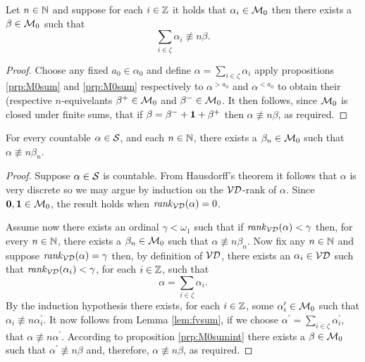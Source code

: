 \begin{prp}\label{prp:M0sumint}
	Let $n\in\mathbb{N}$ and suppose for each $i\in\mathbb{Z}$ it holds that $\alpha_i\in\mathcal{M}_0$ then there exists a $\beta\in\mathcal{M}_0$ such that
	\begin{equation}
		\sum_{i\in\zeta}\alpha_i\nequiv{n}\beta.
	\end{equation}
\end{prp}
\begin{proof}
	Choose any fixed $a_0\in\alpha_0$ and define $\alpha=\sum_{i\in\zeta}\alpha_i$ apply propositions \ref{prp:M0sum} and \ref{prp:M0sum} respectively to $\alpha^{>a_0}$ and $\alpha^{<a_0}$ to obtain their (respective $n$-equivelants $\beta^+\in\mathcal{M}_0$ and $\beta^-\in\mathcal{M}_0$.  It then follows, since $\mathcal{M}_0$ is closed under finite sums, that if $\beta=\beta^-+\mathbf{1}+\beta^+$ then $\alpha\nequiv{n}\beta$, as required.
\end{proof}

\begin{thm}
	For every countable $\alpha\in\mathcal{S}$, and each $n\in\mathbb{N}$, there exists a $\beta_n\in\mathcal{M}_0$ such that $\alpha\nequiv{n}\beta_n$.
\end{thm}
\begin{proof}
	Suppose $\alpha\in\mathcal{S}$ is countable.  From Hausdorff's theorem it follows that $\alpha$ is very discrete so we may argue by induction on the $\mathcal{VD}$-rank of $\alpha$. Since $\mathbf{0},\mathbf{1}\in\mathcal{M}_0$, the result holds when $\mathit{rank}_\mathcal{VD}(\alpha)=0$.

	Assume now there exists an ordinal $\gamma<\omega_1$ such that if $\mathit{rank}_\mathcal{VD}(\alpha)<\gamma$ then, for every $n\in\mathbb{N}$, there exists a $\beta_n\in\mathcal{M}_0$ such that $\alpha\nequiv{n}\beta_n$.  Now fix any $n\in\mathbb{N}$ and  suppose $\mathit{rank}_\mathcal{VD}(\alpha)=\gamma$ then, by definition of $\mathcal{VD}$, there exists an $\alpha_i\in\mathcal{VD}$ such that $\mathit{rank}_\mathcal{VD}(\alpha_i)<\gamma$, for each $i\in\mathbb{Z}$, such that
	\begin{equation}
		\alpha=\sum_{i\in\zeta}\alpha_i.
	\end{equation}
	By the induction hypothesis there exists, for each $i\in\mathbb{Z}$, some $\alpha^\prime_i\in\mathcal{M}_0$ such that $\alpha_i\nequiv{n}\alpha_i^\prime$.  It now follows from Lemma \ref{lem:fvsum}, if we choose $\alpha^\prime=\sum_{i\in\zeta}\alpha_i^\prime$, that $\alpha\nequiv{n}\alpha^\prime$.  According to proposition \ref{prp:M0sumint} there exists a $\beta\in\mathcal{M}_0$ such that $\alpha^\prime\nequiv{n}\beta$ and, therefore, $\alpha\nequiv{n}\beta$, as required.
\end{proof}

